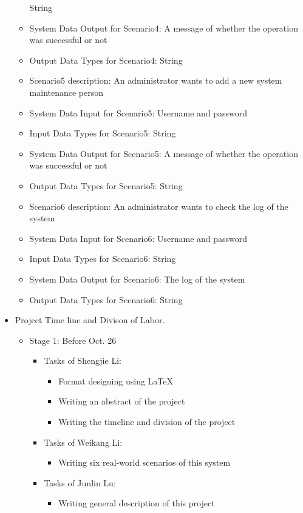 \begin{itemize}
\begin{itemize}
	String
	\item{System Data Output for Scenario4: }
	A message of whether the operation was successful or not
	\item{Output Data Types for Scenario4: }
	String
	\item{Scenario5 description: }
	An administrator wants to add a new system maintenance person
	\item{System Data Input for Scenario5: }
	Username and password  
	\item{Input Data Types for Scenario5: }
	String
	\item{System Data Output for Scenario5: }
	A message of whether the operation was successful or not
	\item{Output Data Types for Scenario5: }
	String
	\item{Scenario6 description: }
	An administrator wants to check the log of the system
	\item{System Data Input for Scenario6: }
	Username and password
	\item{Input Data Types for Scenario6: }
	String
	\item{System Data Output for Scenario6: }
	The log of the system
	\item{Output Data Types for Scenario6: }
	String
	\end{itemize}
\item{Project Time line and Divison of Labor.}
\begin{itemize}
	\item {Stage 1: Before Oct. 26} 
	\begin{itemize}
		\item {Tasks of Shengjie Li:}
		\begin{itemize}
			\item {Format designing using \LaTeX}
			\item {Writing an abstract of the project}
			\item {Writing the timeline and division of the project}
		\end{itemize}
		\item {Tasks of Weikang Li:}
		\begin{itemize}
			\item {Writing six real-world scenarios of this system}
		\end{itemize}
		\item {Tasks of Junlin Lu:}
		\begin{itemize}
			\item {Writing general description of this project}

\end{itemize}
\end{itemize}
\end{itemize}
\end{itemize}
